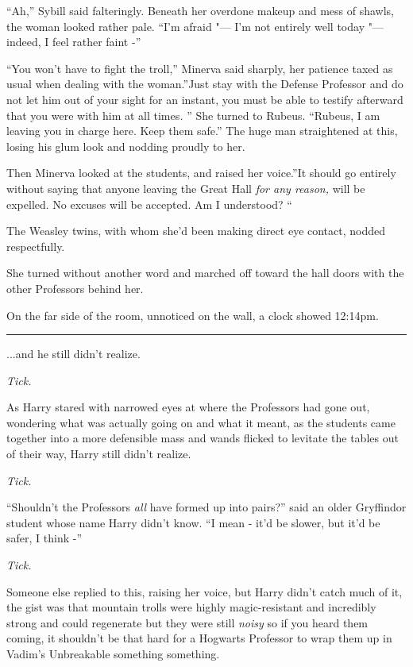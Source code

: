 ``Ah,'' Sybill said falteringly. Beneath her overdone makeup and mess of
shawls, the woman looked rather pale. ``I'm afraid "--- I'm not entirely
well today "--- indeed, I feel rather faint -''

``You won't have to fight the troll,'' Minerva said sharply, her
patience taxed as usual when dealing with the woman.''Just stay with the
Defense Professor and do not let him out of your sight for an instant,
you must be able to testify afterward that you were with him at all
times\emph{.} '' She turned to Rubeus. ``Rubeus, I am leaving you in
charge here. Keep them safe.'' The huge man straightened at this, losing
his glum look and nodding proudly to her.

Then Minerva looked at the students, and raised her voice.''It should go
entirely without saying that anyone leaving the Great Hall \emph{for any
reason,} will be expelled. No excuses will be accepted. Am I understood?
``

The Weasley twins, with whom she'd been making direct eye contact,
nodded respectfully.

She turned without another word and marched off toward the hall doors
with the other Professors behind her.

On the far side of the room, unnoticed on the wall, a clock showed
12:14pm.

\begin{center}\rule{3in}{0.4pt}\end{center}

...and he still didn't realize.

\emph{Tick.}

As Harry stared with narrowed eyes at where the Professors had gone out,
wondering what was actually going on and what it meant, as the students
came together into a more defensible mass and wands flicked to levitate
the tables out of their way, Harry still didn't realize.

\emph{Tick.}

``Shouldn't the Professors \emph{all} have formed up into pairs?'' said
an older Gryffindor student whose name Harry didn't know. ``I mean -
it'd be slower, but it'd be safer, I think -''

\emph{Tick.}

Someone else replied to this, raising her voice, but Harry didn't catch
much of it, the gist was that mountain trolls were highly
magic-resistant and incredibly strong and could regenerate but they were
still \emph{noisy} so if you heard them coming, it shouldn't be that
hard for a Hogwarts Professor to wrap them up in Vadim's Unbreakable
something something.

